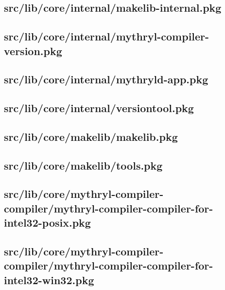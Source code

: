 \subsection{src/lib/core/internal/makelib-internal.pkg}


\subsection{src/lib/core/internal/mythryl-compiler-version.pkg}


\subsection{src/lib/core/internal/mythryld-app.pkg}


\subsection{src/lib/core/internal/versiontool.pkg}


\subsection{src/lib/core/makelib/makelib.pkg}


\subsection{src/lib/core/makelib/tools.pkg}


\subsection{src/lib/core/mythryl-compiler-compiler/mythryl-compiler-compiler-for-intel32-posix.pkg}


\subsection{src/lib/core/mythryl-compiler-compiler/mythryl-compiler-compiler-for-intel32-win32.pkg}


